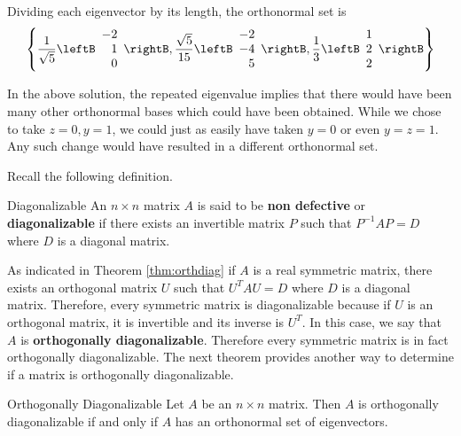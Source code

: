 \begin{solution}
Dividing each eigenvector by its length, the orthonormal set is 
\begin{equation*}
\left\{ \frac{1}{\sqrt{5}} \leftB 
\begin{array}{r}
-2\\ 
1 \\ 
0
\end{array}
\rightB , \frac{\sqrt{5}}{15} \leftB 
\begin{array}{r}
-2 \\ 
-4 \\ 
5
\end{array}
\rightB , \frac{1}{3}\leftB
\begin{array}{r}
1 \\ 
2 \\ 
2
\end{array}
\rightB \right\}
\end{equation*}

\end{solution}

In the above solution, the repeated eigenvalue implies that there would have been many other
orthonormal bases which could have been obtained. While we chose to
take $z=0, y=1$, we could just as easily have taken $y=0$
or even $y=z=1.$ Any such change would have resulted in a different
orthonormal set. 

Recall the following definition.

\begin{definition}{Diagonalizable}\label{def:nondefective}
An $n\times n$ matrix $A$ is said to be \textbf{non defective}
or \textbf{diagonalizable}
 if there exists an invertible matrix $P$ such that $
P^{-1}AP=D$ where $D$ is a diagonal matrix.
\end{definition}

As indicated in Theorem \ref{thm:orthdiag} if $A$ is a real symmetric matrix, there exists an
orthogonal matrix $U$ such that $U^{T}AU=D$ where $D$ is a diagonal matrix. Therefore,
every symmetric matrix is diagonalizable because if $U$ is an orthogonal
matrix, it is invertible and its inverse is $U^{T}$. In this case, we say that $A$ is \textbf{orthogonally diagonalizable}. Therefore every symmetric matrix is in fact orthogonally diagonalizable. The next theorem provides another way to determine if a matrix is orthogonally diagonalizable. 

\begin{theorem}{Orthogonally Diagonalizable}\label{thm:orthdiagonalizable}
Let $A$ be an $n \times n$ matrix. Then $A$ is orthogonally diagonalizable if and only if $A$ has an orthonormal set of eigenvectors. 
\end{theorem}

